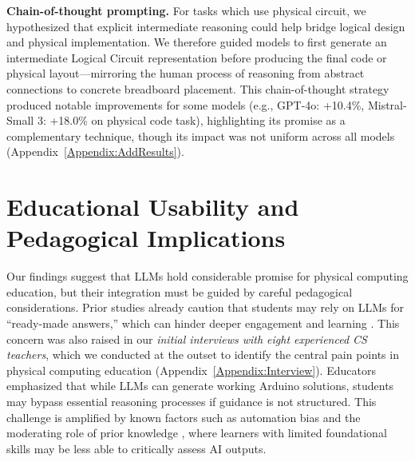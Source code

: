 \documentclass{article} %
\begin{document}
\textbf{Chain-of-thought prompting.} \;
For tasks which use physical circuit, we hypothesized that explicit intermediate reasoning could help bridge logical design and physical implementation. 
We therefore guided models to first generate an intermediate Logical Circuit representation before producing the final code or physical layout—mirroring the human process of reasoning from abstract connections to concrete breadboard placement. 
This chain-of-thought strategy produced notable improvements for some models (e.g., GPT-4o: +10.4\%, Mistral-Small 3: +18.0\% on physical code task), highlighting its promise as a complementary technique, though its impact was not uniform across all models (Appendix~\ref{Appendix:AddResults}).

\section{Educational Usability and Pedagogical Implications}
\label{Sec:Discussion}

Our findings suggest that LLMs hold considerable promise for physical computing education, but their integration must be guided by careful pedagogical considerations. 
Prior studies already caution that students may rely on LLMs for “ready-made answers,” which can hinder deeper engagement and learning \citep{anson2024impact,jovst2024impact}. 
This concern was also raised in our \emph{initial interviews with eight experienced CS teachers}, which we conducted at the outset to identify the central pain points in physical computing education (Appendix~\ref{Appendix:Interview}). 
Educators emphasized that while LLMs can generate working Arduino solutions, students may bypass essential reasoning processes if guidance is not structured. 
This challenge is amplified by known factors such as automation bias \citep{li2025delving} and the moderating role of prior knowledge \citep{lee2025impact}, where learners with limited foundational skills may be less able to critically assess AI outputs.
\end{document}

